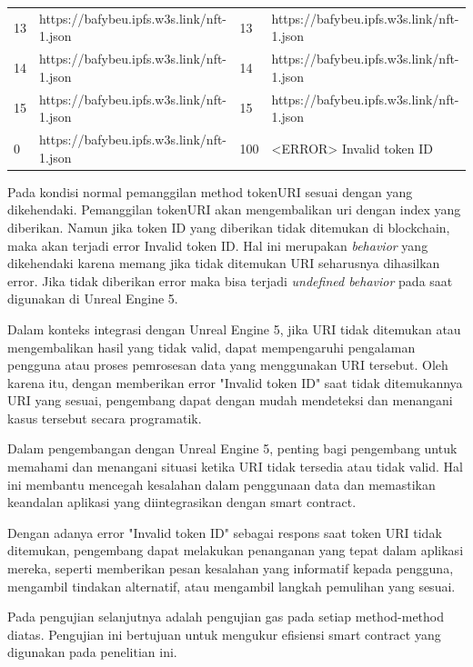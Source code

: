 \begin{longtable}{|p{0.5in}|p{2.2in}|p{0.5in}|p{2.2in}|}
  13               & https://bafybeu.ipfs.w3s.link/nft-1.json & 13                                 & https://bafybeu.ipfs.w3s.link/nft-1.json \\
  14               & https://bafybeu.ipfs.w3s.link/nft-1.json & 14                                 & https://bafybeu.ipfs.w3s.link/nft-1.json \\
  15               & https://bafybeu.ipfs.w3s.link/nft-1.json & 15                                 & https://bafybeu.ipfs.w3s.link/nft-1.json \\
  0                & https://bafybeu.ipfs.w3s.link/nft-1.json & 100                                & <ERROR> Invalid token ID                 \\
  \hline
\end{longtable}

Pada kondisi normal pemanggilan method tokenURI sesuai dengan yang dikehendaki. Pemanggilan tokenURI akan mengembalikan uri dengan index yang diberikan.
Namun jika token ID yang diberikan tidak ditemukan di blockchain, maka akan terjadi error Invalid token ID.
Hal ini merupakan \emph{behavior} yang dikehendaki karena memang jika tidak ditemukan URI seharusnya dihasilkan error.
Jika tidak   diberikan  error maka bisa terjadi \emph{undefined behavior} pada saat digunakan di Unreal Engine 5.

Dalam konteks integrasi dengan Unreal Engine 5, jika URI tidak ditemukan atau mengembalikan hasil yang tidak valid, dapat mempengaruhi pengalaman pengguna atau proses pemrosesan data yang menggunakan URI tersebut. Oleh karena itu, dengan memberikan error "Invalid token ID" saat tidak ditemukannya URI yang sesuai, pengembang dapat dengan mudah mendeteksi dan menangani kasus tersebut secara programatik.

Dalam pengembangan dengan Unreal Engine 5, penting bagi pengembang untuk memahami dan menangani situasi ketika URI tidak tersedia atau tidak valid. Hal ini membantu mencegah kesalahan dalam penggunaan data dan memastikan keandalan aplikasi yang diintegrasikan dengan smart contract.

Dengan adanya error "Invalid token ID" sebagai respons saat token URI tidak ditemukan, pengembang dapat melakukan penanganan yang tepat dalam aplikasi mereka, seperti memberikan pesan kesalahan yang informatif kepada pengguna, mengambil tindakan alternatif, atau mengambil langkah pemulihan yang sesuai.

Pada pengujian selanjutnya adalah pengujian gas pada setiap method-method diatas. Pengujian ini bertujuan untuk mengukur
efisiensi smart contract yang digunakan pada penelitian ini.

